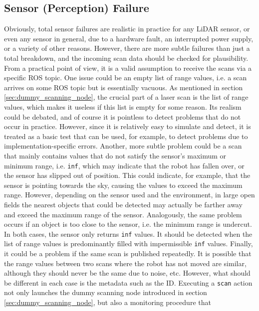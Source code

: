 \documentclass[english, master, utf8]{base/thesis_KBS}
\newcommand{\code}[1]{\colorbox{light-gray}{\texttt{#1}}}
\begin{document}
\subsection{Sensor (Perception) Failure}
\label{sec:sim_and_mon_sensor_failures}

Obviously, total sensor failures are realistic in practice for any LiDAR sensor, or even any sensor in general, due to a hardware fault, an interrupted
power supply, or a variety of other reasons. However, there are more subtle failures than just a total breakdown, and the incoming scan data should be checked for plausibility.
From a practical point of view, it is a valid assumption to receive the scans via a specific ROS topic. One issue could be an empty list of range values, i.e. a scan arrives on
some ROS topic but is essentially vacuous. As mentioned in section \ref{sec:dummy_scanning_node}, the crucial part of a laser scan is the list of range values, which makes it 
useless if this list is empty for some reason. Its realism could be debated, and of course it is pointless to detect problems that do not occur in practice. However, since it is
relatively easy to simulate and detect, it is treated as a basic test that can be used, for example, to detect problems due to implementation-specific errors.
Another, more subtle problem could be a scan that mainly contains values that do not satisfy the sensor's maximum or minimum range, i.e. \code{inf}, which may indicate that
the robot has fallen over, or the sensor has slipped out of position. This could indicate, for example, that the sensor is pointing towards the sky, causing the values to exceed
the maximum range. However, depending on the sensor used and the environment, in large open fields the nearest objects that could be detected may actually be farther away and exceed
the maximum range of the sensor. Analogously, the same problem occurs if an object is too close to the sensor, i.e. the minimum range is undercut. In both cases, the sensor only
returns \code{inf} values. It should be detected when the list of range values is predominantly filled with impermissible \code{inf} values. Finally, it could be a problem if the
same scan is published repeatedly. It is possible that the range values between two scans where the robot has not moved are similar, although they should never be the same due to
noise, etc. However, what should be different in each case is the metadata such as the ID.\newline
Executing a \code{scan} action not only launches the dummy scanning node introduced in section \ref{sec:dummy_scanning_node}, but also a monitoring procedure that
\end{document}
